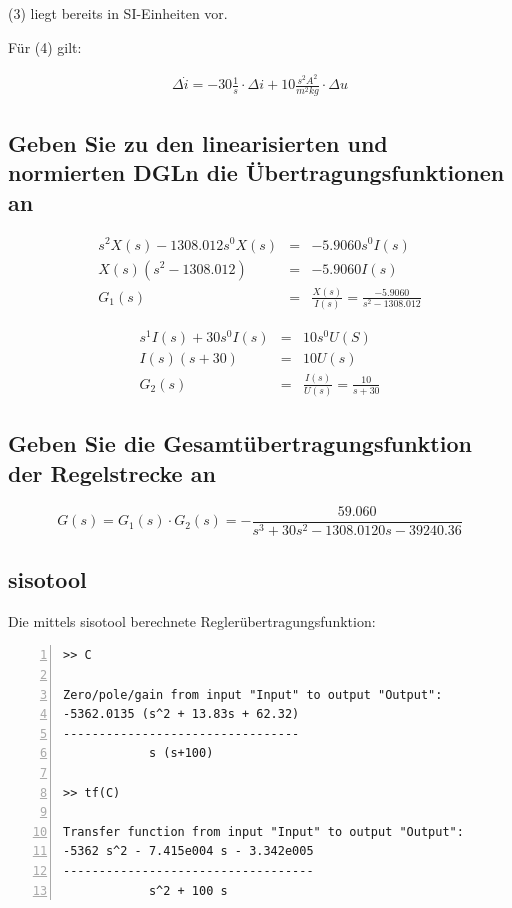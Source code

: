 \documentclass[a4paper,10pt,left=1.5cm,right=1.5cm,top=1.5cm,bottom=1.5cm]{article}
\begin{document}
(3) liegt bereits in SI-Einheiten vor.

Für (4) gilt:

\begin{eqnarray}
  \Delta \dot{i} = -30 \frac{1}{s} \cdot \Delta i + 10 \frac{s^2 A^2}{m^2 kg} \cdot \Delta u
\end{eqnarray}


\subsection{Geben Sie zu den linearisierten und normierten DGLn die Übertragungsfunktionen an}

\begin{eqnarray*}
  s^2 X(s) - 1308.012 s^0 X(s) &=& -5.9060 s^0 I(s) \\
  X(s)(s^2 - 1308.012) &=& -5.9060 I(s) \\
  G_1(s) &=& \frac{X(s)}{I(s)} = \frac{-5.9060}{s^2 - 1308.012}
\end{eqnarray*}

\begin{eqnarray*}
  s^1 I(s) + 30 s^0 I(s) &=& 10 s^0 U(S) \\
  I(s)(s + 30) &=& 10 U(s) \\
  G_2(s) &=& \frac{I(s)}{U(s)} = \frac{10}{s + 30} 
\end{eqnarray*}

\subsection{Geben Sie die Gesamtübertragungsfunktion der Regelstrecke an}

\begin{equation}
  G(s) = G_1(s) \cdot G_2(s) = - \frac{59.060}{s^3 + 30 s^2 - 1308.0120 s - 39240.36}
\end{equation}

\subsection{sisotool}

Die mittels sisotool berechnete Reglerübertragungsfunktion:

\begin{lstlisting}[numbers=left]
>> C
 
Zero/pole/gain from input "Input" to output "Output":
-5362.0135 (s^2 + 13.83s + 62.32)
---------------------------------
            s (s+100)
 
>> tf(C)
 
Transfer function from input "Input" to output "Output":
-5362 s^2 - 7.415e004 s - 3.342e005
-----------------------------------
            s^2 + 100 s
\end{lstlisting}
\end{document}
